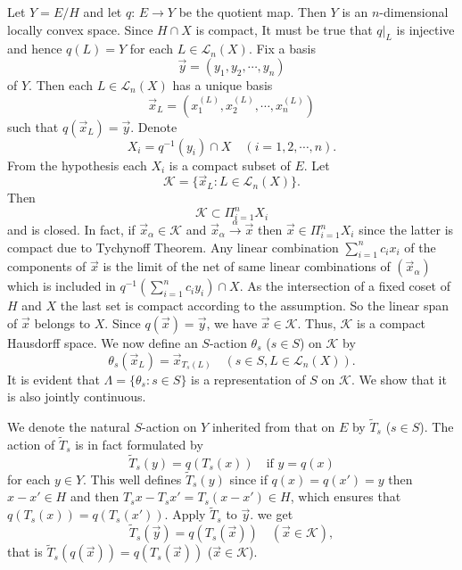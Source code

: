 \documentclass{tran-l}
\numberwithin{equation}{section}
\theoremstyle{definition}
\theoremstyle{remark}
\begin{document}
Let $Y = E/H$ and let $q$: $E\to Y$ be the quotient map. Then $Y$ is an $n$-dimensional locally convex space. Since $H\cap X$ is compact, It must be true that $q|_L$ is injective and hence $q(L) = Y$ for each $L\in {\mathcal{L}}_n(X)$. Fix a basis 
\[
\vec{y}=(y_1,y_2,\cdots,y_n)
\]
 of $Y$. Then each $L\in {\mathcal{L}}_n(X)$ has a unique basis 
 \[
 \vec x_L=(x^{(L)}_1,x^{(L)}_2,\cdots,x^{(L)}_n)
 \]
   such that $q(\vec x_L) = \vec y$. Denote 
   \[
   X_i= q^{-1}(y_i)\cap X \quad (i=1,2,\cdots,n).
   \]
    From the hypothesis each $X_i$ is a compact subset of $E$. Let 
\[
{\mathcal{K}} = \{\vec x_L: L\in {\mathcal{L}}_n(X)\}.
\]
 Then 
 \[
 {\mathcal{K}}\subset \Pi_{i=1}^n X_i
 \]
  and is closed. In fact, if $\vec x_{\alpha}\in {\mathcal{K}}$ and $\vec x_{\alpha} \stackrel{\alpha}{\to}\vec x$ then $\vec x\in \Pi_{i=1}^n X_i$ since the latter is compact due to Tychynoff Theorem. Any linear combination $\sum_{i=1}^n{c_ix_i}$ of the components of $\vec x$ is the limit of the net of  same linear combinations of $(\vec x_{\alpha})$ which is included in $q^{-1}(\sum_{i=1}^n{c_iy_i})\cap X$. As the intersection of a fixed coset of $H$ and $X$ the last set is compact according to the assumption. So the linear span of $\vec x$ belongs to $X$. Since $q(\vec x)=\vec y$, we have $\vec x\in {\mathcal{K}}$. Thus, ${\mathcal{K}}$ is a compact Hausdorff space. We now define an $S$-action $\theta_s$ ($s\in S$) on ${\mathcal{K}}$ by 
\[\theta_s(\vec x_L) = \vec x_{T_s(L)} \quad (s\in S, L\in {\mathcal{L}}_n(X)).
\]
 It is evident that $\Lambda = \{\theta_s: s\in S\}$ is a representation of $S$ on ${\mathcal{K}}$. We show that it is also jointly continuous.

We denote the natural $S$-action on $Y$ inherited from that on $E$ by $\tilde T_s$ ($s\in S$). The action of $\tilde T_s$ is in fact formulated by
\[
\tilde T_s( y) = q(T_s( x)) \quad \text{if } y=q(x)
\]
for each $y\in Y$. This well defines $\tilde T_s(y)$ since if $q(x) = q(x') = y$ then $x-x'\in H$ and then $T_sx-T_sx' = T_s(x-x')\in H$, which ensures that $q(T_s(x)) = q(T_s(x'))$. Apply $\tilde T_s$ to $\vec y$. we get
\begin{equation}\label{tilde T}
\tilde T_s(\vec y) = q(T_s(\vec x)) \quad (\vec x \in {\mathcal{K}}),
\end{equation}
that is $\tilde T_s(q(\vec x)) = q(T_s(\vec x))$  ($\vec x \in {\mathcal{K}}$).
\end{document}
